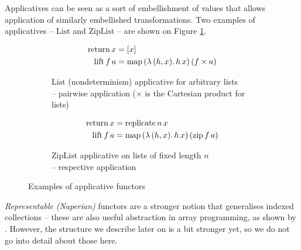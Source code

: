 Applicatives can be seen as a sort of embellishment of values that allows application of similarly embellished transformations. Two examples of applicatives -- $\mathrm{List}$ and $\mathrm{ZipList}$ -- are shown on Figure \ref{fig:applicatives}.
%
\begin{figure}[h]
\centering
\begin{subfigure}{.5\textwidth}
  \centering
  \begin{align*}
\mathrm{return}\,x &= [x] \\
\mathrm{lift}\,f\,a &= \mathrm{map}\,(\lambda\,(h, x) \ldotp h\,x)\,(f \times a)
  \end{align*}
  \caption{$\mathrm{List}$ (nondeterminism) applicative for arbitrary lists \\ -- pairwise application ($\times$ is the Cartesian product for lists)}
\end{subfigure}%
\begin{subfigure}{.5\textwidth}
  \centering
  \begin{align*}
\mathrm{return}\,x &= \mathrm{replicate}\,n\,x \\
\mathrm{lift}\,f\,a &= \mathrm{map}\,(\lambda\,(h, x) \ldotp h\,x)\,(\mathrm{zip}\,f\,a)
  \end{align*}
  \caption{$\mathrm{ZipList}$ applicative on lists of fixed length $n$ \\ -- respective application}
\end{subfigure}
\caption{Examples of applicative functors}
\label{fig:applicatives}
\end{figure}

\textit{Representable} \textit{(Naperian)} functors are a stronger notion that generalises indexed collections -- these are also useful abstraction in array programming, as shown by \textcite{gibbons2016aplicative}. However, the structure we describe later on is a bit stronger yet, so we do not go into detail about those here.



